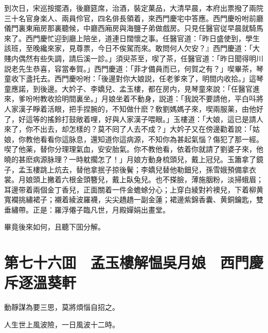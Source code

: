 到次日，宋巡按擺酒，後廳筵席，治酒，裝定菓品，大清早晨，本府出票撥了兩院三十名官身楽人、兩員伶官，四名俳長領着，來西門慶宅中答應。西門慶吩咐前廳儀門裏東廂房那裏聽候，中廳西廂房與海鹽子弟做戲房。只見任醫官従早晨就騎馬來了。西門慶忙迎到廳上陪坐，道連日闊懷之事。任醫官道：「昨日盛使到，學生該班，至晚纔來家，見尊票，今日不俟駕而來。敢問何人欠安？』西門慶道：「大賤内偶然有些失調，請后溪一診。」須臾茶至，喫了茶，任醫官道：「昨日聞得明川説老先生恭喜，容當奉賀。」西門慶道：「菲才備員而已，何賀之有？」喫畢茶，琴童收下盞托去。西門慶吩咐：「後邊對你大娘説，任老爹來了，明間内收拾。」這琴童應諾，到後邊。大妗子、李嬌兒、孟玉樓，都在房内，見琴童來說：「任醫官進來，爹吩咐教收拾明間裏坐。」月娘坐着不動身，説道：「我說不要請他，平白呌將人家漢子睜着活眼，把手捏腕的，不知做什麽？敎劉媽媽子來，喫兩服薬，由他好了，好這等的搖鈴打鼓敞着哩，好與人家漢子喂眼。」玉樓道：「大娘，這已是請人來了，你不出去，却怎樣的？莫不囘了人去不成？」大妗子又在傍邊勸着說：「姑娘，你教他看看你這脉息，還知道你這病源，不知你為甚起氣惱？傷犯了那一經。喫了他薬，替你分理理氣血，安安胎氣。你不教他看，依着你就請了劉婆子來，他曉的甚麽病源脉理？一時躭擱怎了！」月娘方動身梳頭兒，戴上冠兒。玉簫拿了鏡子，孟玉樓跳上炕去，替他拿抿子掠後鬢；李嬌兒替他勒鈿兒，孫雪娥預備拿衣裳。月娘頭上撇着六根金頭簪兒，戴上臥兔兒。也不搽臉，薄施胭粉，淡掃蛾眉；耳邊带着兩個金丁香兒，正面關着一件金蟾蜍分心；上穿白綾對衿襖兒，下着柳黄寬襴挑繡裙子；襯着綾波羅襪，尖尖趫趫一副金蓮；裙邊紫錦香囊、黄銅鑰匙，雙垂繡帶。正是：羅浮僊子臨凡世，月殿嬋娟出畫堂。

畢竟後來如何，且聽下囬分解。

\chapter*{第七十六囬　孟玉樓解愠吳月娘　西門慶斥逐溫葵軒}

動靜謀為要三思，莫將煩惱自招之。

人生世上風波險，一日風波十二時。

